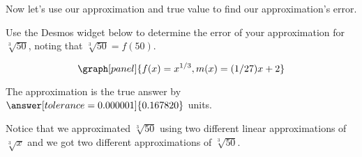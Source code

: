 \documentclass[handout,nooutcomes]{ximera}
\begin{document}
\begin{example}
\begin{explanation}
Now let's use our approximation and true value to find our approximation's error.

Use the Desmos widget below to determine the error of your approximation for $\sqrt[3]{50}$, noting that $\sqrt[3]{50} = f(50)$.

\[
\graph[panel]{f(x) = x^{1/3}, m(x) = (1/27) x + 2}
\]


The approximation is  the true 
answer by $\answer[tolerance=0.000001]{0.167820}$ units.

\end{explanation}
\end{example}

Notice that we approximated $\sqrt[3]{50}$ using two different linear approximations of $\sqrt[3]{x}$ and we got two different approximations of $\sqrt[3]{50}$.
\end{document}
